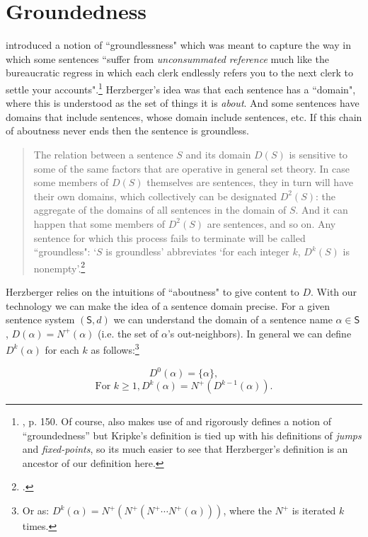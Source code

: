\documentclass[12pt]{kluwer}
\theoremstyle{remark}
\def\S{\textsf{S}}
\begin{document}
\section{Groundedness}
\label{sec5}

\cite{herzberger1970} introduced a notion of ``groundlessness" which was meant to capture the way in which some sentences ``suffer from \textit{unconsummated reference} much like the bureaucratic regress in which each clerk endlessly refers you to the next clerk to settle your accounts".\footnote{\cite{herzberger1970}, p. 150. Of course, \cite{kripke75} also makes use of and rigorously defines a notion of ``groundedness'' but Kripke's definition is tied up with his definitions of \textit{jumps} and \textit{fixed-points}, so its much easier to see that Herzberger's definition is an ancestor of our definition here.} Herzberger's idea was that each sentence has a ``domain", where this is understood as the set of things it is \textit{about}. And some sentences have domains that include sentences, whose domain include sentences, etc. If this chain of aboutness never ends then the sentence is groundless.

\begin{quote}
The relation between a sentence $S$ and its domain $D(S)$ is sensitive to some of the same factors that are operative in general set theory. In case some members of $D(S)$ themselves are sentences, they in turn will have their own domains, which collectively can be designated $D^2(S)$: the aggregate of the domains of all sentences in the domain of $S$. And it can happen that some members of $D^2(S)$ are sentences, and so on. Any sentence for which this process fails to terminate will be called ``groundless": `$S$ is groundless' abbreviates `for each integer $k$, $D^k(S)$ is nonempty'.\footnote{\cite{herzberger1970}.}
\end{quote}

Herzberger relies on the intuitions of ``aboutness" to give content to $D$. With our technology we can make the idea of a sentence domain precise.  For a given sentence system $(\S,d)$ we can understand the domain of a sentence name $\alpha \in \S$, $D(\alpha) = N^{+}(\alpha)$ (i.e. the set of $\alpha$'s out-neighbors). In general we can define $D^k(\alpha)$ for each $k$ as follows:\footnote{Or as: $D^k(\alpha) = N^+(N^+(N^+\cdots N^+(\alpha)))$, where the $N^+$ is iterated $k$ times.}

\[D^0(\alpha) = \{\alpha\},\]
\[\text{For } k \geq 1, D^k(\alpha) = N^+(D^{k-1}(\alpha)).\]
\end{document}
